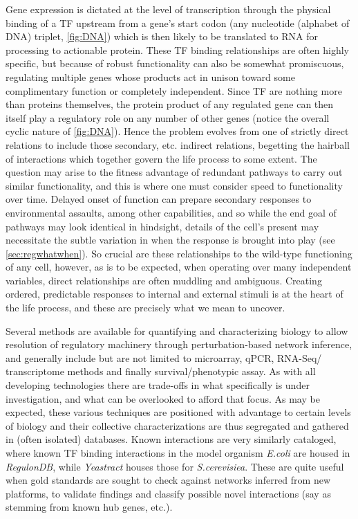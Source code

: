 Gene expression is dictated at the level of transcription through the physical binding of a TF upstream from a gene's start codon (any nucleotide (alphabet of DNA) triplet, \cref{fig:DNA}) which is then likely to be translated to RNA for processing to actionable protein. These TF binding relationships are often highly specific, but because of robust functionality can also be somewhat promiscuous, regulating multiple genes whose products act in unison toward some complimentary function or completely independent. Since TF are nothing more than proteins themselves, the protein product of any regulated gene can then itself play a regulatory role on any number of other genes (notice the overall cyclic nature of \cref{fig:DNA}). Hence the problem evolves from one of strictly direct relations to include those secondary, etc. indirect relations, begetting the hairball of interactions which together govern the life process to some extent. The question may arise to the fitness advantage of redundant pathways to carry out similar functionality, and this is where one must consider speed to functionality over time. Delayed onset of function can prepare secondary responses to environmental assaults, among other capabilities, and so while the end goal of pathways may look identical in hindsight, details of the cell's present may necessitate the subtle variation in when the response is brought into play (see \cref{sec:regwhatwhen}). So crucial are these relationships to the wild-type functioning of any cell, however, as is to be expected, when operating over many independent variables, direct relationships are often muddling and ambiguous. Creating ordered, predictable responses to internal and external stimuli is at the heart of the life process, and these are precisely what we mean to uncover.

Several methods are available for quantifying and characterizing biology to allow resolution of regulatory machinery through perturbation-based network inference, and generally include but are not limited to microarray, qPCR, RNA-Seq/ transcriptome methods and finally survival/phenotypic assay. As with all developing technologies there are trade-offs in what specifically is under investigation, and what can be overlooked to afford that focus. As may be expected, these various techniques are positioned with advantage to certain levels of biology and their collective characterizations are thus segregated and gathered in (often isolated) databases. Known interactions are very similarly cataloged, where known TF binding interactions in the model organism \emph{E.coli} are housed in \emph{RegulonDB}\cite{gama2008regulondb}, while \emph{Yeastract}\cite{teixeira2006yeastract} houses those for \emph{S.cerevisiea}. These are quite useful when gold standards are sought to check against networks inferred from new platforms, to validate findings and classify possible novel interactions (say as stemming from known hub genes, etc.).

